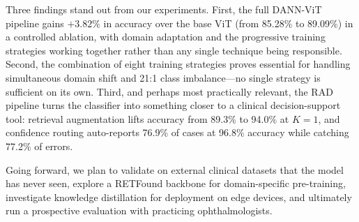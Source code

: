\documentclass[conference]{IEEEtran}
\begin{document}
Three findings stand out from our experiments. First, the full DANN-ViT pipeline gains $+3.82\%$ in accuracy over the base ViT (from 85.28\% to 89.09\%) in a controlled ablation, with domain adaptation and the progressive training strategies working together rather than any single technique being responsible. Second, the combination of eight training strategies proves essential for handling simultaneous domain shift and 21:1 class imbalance---no single strategy is sufficient on its own. Third, and perhaps most practically relevant, the RAD pipeline turns the classifier into something closer to a clinical decision-support tool: retrieval augmentation lifts accuracy from 89.3\% to 94.0\% at $K\!=\!1$, and confidence routing auto-reports 76.9\% of cases at 96.8\% accuracy while catching 77.2\% of errors.

Going forward, we plan to validate on external clinical datasets that the model has never seen, explore a RETFound backbone for domain-specific pre-training, investigate knowledge distillation for deployment on edge devices, and ultimately run a prospective evaluation with practicing ophthalmologists.
\end{document}
